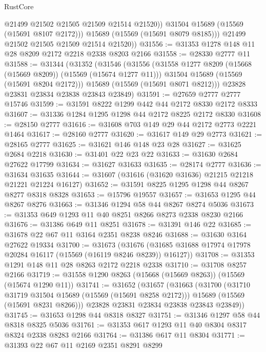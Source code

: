 \begin{lexlean}{RustCore}
\begin{coremodule}
                @21499
                @21502
                @21505
                @21509
                @21514
                @21520))
            @31504
            @15689
            (@15569 (@15691 @8107 @2172)))
          @15689
          (@15569 (@15691 @8079 @8185)))
        @21499
        @21502
        @21505
        @21509
        @21514
        @21520))
@31556 := @31353 @1278 @148 @11 @28 @8209 @2172 @2218 @2338 @8203 @2166
@31558 := @28330 @2777 @11
@31588 := @31344
    (@31352
      (@31546
        (@31556
          (@31558 @1277 @8209 (@15668 (@15669 @8209)) (@15569 (@15674 @1277 @11)))
          @31504
          @15689
          (@15569 (@15691 @8204 @2172)))
        @15689
        (@15569 (@15691 @8071 @8212)))
      @23828
      @23831
      @23834
      @23838
      @23843
      @23849)
@31591 := @27659 @2777 @2777 @15746
@31599 := @31591 @8222 @1299 @442 @44 @2172 @8330 @2172 @8333
@31607 := @31336 @1284 @1295 @1298 @44 @2172 @8225 @2172 @8330
@31608 := @28150 @2777
@31616 := @31608 @703 @149 @29 @44 @2172 @2773 @2221 @1464
@31617 := @28160 @2777
@31620 := @31617 @149 @29 @2773
@31621 := @28165 @2777
@31625 := @31621 @146 @148 @23 @28
@31627 := @31625 @2684 @2218
@31630 := @31401 @22 @23 @22
@31633 := @31630 @2684 @27622 @17799
@31634 := @31627 @31633
@31635 := @28174 @2777
@31636 := @31634 @31635
@31644 := @31607 (@31616 (@31620 @31636) @21215 @21218 @21221 @21224 @16127)
@31652 := @31591 @8225 @1295 @1298 @44 @8267 @8277 @8318 @8328
@31653 := @15796 @19557
@31657 := @31653 @1295 @44 @8267 @8276
@31663 := @31346 @1294 @58 @44 @8267 @8274 @5036
@31673 := @31353 @649 @1293 @11 @40 @8251 @8266 @8273 @2338 @8230 @2166
@31676 := @31386 @649 @11 @8251
@31678 := @31391 @146 @22
@31685 := @31678 @22 @67 @11 @3164 @2351 @8238 @8246
@31688 := @31630 @3164 @27622 @19334
@31700 := @31673
    (@31676 (@31685 @31688 @17974 @17978 @20284 @16117 (@15569 (@16119 @8246 @8239)) @16127))
@31708 := @31353 @1291 @148 @11 @28 @8263 @2172 @2218 @2338
@31710 := @31708 @8257 @2166
@31719 := @31558 @1290 @8263 (@15668 (@15669 @8263)) (@15569 (@15674 @1290 @11))
@31741 := @31652
    (@31657
      (@31663
        (@31700
          (@31710 @31719 @31504 @15689 (@15569 (@15691 @8258 @2172)))
          @15689
          (@15569 (@15691 @8231 @8266)))
        @23828
        @23831
        @23834
        @23838
        @23843
        @23849))
@31745 := @31653 @1298 @44 @8318 @8327
@31751 := @31346 @1297 @58 @44 @8318 @8325 @5036
@31761 := @31353 @617 @1293 @11 @40 @8304 @8317 @8324 @2338 @8283 @2166
@31764 := @31386 @617 @11 @8304
@31771 := @31393 @22 @67 @11 @2169 @2351 @8291 @8299

\end{coremodule}
\end{lexlean}
